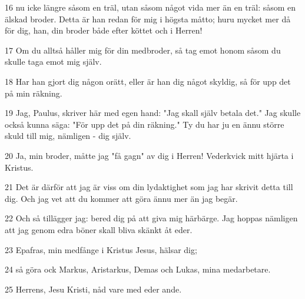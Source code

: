 \par 16 nu icke längre såsom en träl, utan såsom något vida mer än en träl: såsom en älskad broder. Detta är han redan för mig i högsta måtto; huru mycket mer då för dig, han, din broder både efter köttet och i Herren!
\par 17 Om du alltså håller mig för din medbroder, så tag emot honom såsom du skulle taga emot mig själv.
\par 18 Har han gjort dig någon orätt, eller är han dig något skyldig, så för upp det på min räkning.
\par 19 Jag, Paulus, skriver här med egen hand: "Jag skall själv betala det." Jag skulle också kunna säga: "För upp det på din räkning." Ty du har ju en ännu större skuld till mig, nämligen - dig själv.
\par 20 Ja, min broder, måtte jag "få gagn" av dig i Herren! Vederkvick mitt hjärta i Kristus.
\par 21 Det är därför att jag är viss om din lydaktighet som jag har skrivit detta till dig. Och jag vet att du kommer att göra ännu mer än jag begär.
\par 22 Och så tillägger jag: bered dig på att giva mig härbärge. Jag hoppas nämligen att jag genom edra böner skall bliva skänkt åt eder.
\par 23 Epafras, min medfånge i Kristus Jesus, hälsar dig;
\par 24 så göra ock Markus, Aristarkus, Demas och Lukas, mina medarbetare.
\par 25 Herrens, Jesu Kristi, nåd vare med eder ande.


